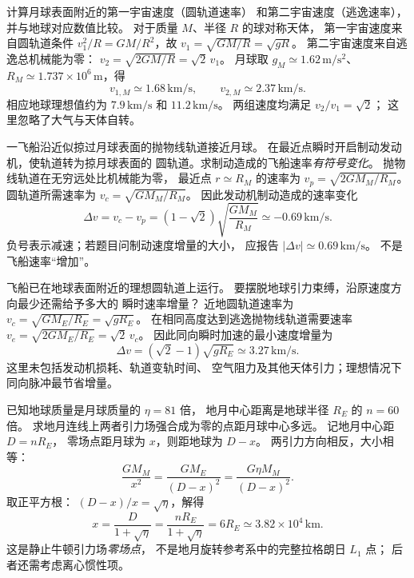 计算月球表面附近的第一宇宙速度（圆轨道速率）
和第二宇宙速度（逃逸速率），并与地球对应数值比较。
\exsolution
对于质量 $M$、半径 $R$ 的球对称天体，
第一宇宙速度来自圆轨道条件
$v_1^2/R=GM/R^2$，故
$v_1=\sqrt{GM/R}=\sqrt{gR}$。
第二宇宙速度来自逃逸总机械能为零：
$v_2=\sqrt{2GM/R}=\sqrt2\,v_1$。
月球取 $g_M\simeq1.62\,\mathrm{m/s^2}$、
$R_M\simeq1.737\times10^6\,\mathrm m$，得
\[
\boxed{v_{1,M}\simeq1.68\,\mathrm{km/s},\qquad
v_{2,M}\simeq2.37\,\mathrm{km/s}}.
\]
相应地球理想值约为
$7.9\,\mathrm{km/s}$ 和 $11.2\,\mathrm{km/s}$。
\excheck 两组速度均满足 $v_2/v_1=\sqrt2$；
这里忽略了大气与天体自转。

一飞船沿近似掠过月球表面的抛物线轨道接近月球。
在最近点瞬时开启制动发动机，使轨道转为掠月球表面的
圆轨道。求制动造成的飞船速率\emph{有符号变化}。
\exsolution
抛物线轨道在无穷远处比机械能为零，
最近点 $r\simeq R_M$ 的速率为
$v_p=\sqrt{2GM_M/R_M}$。
圆轨道所需速率为
$v_c=\sqrt{GM_M/R_M}$。
因此发动机制动造成的速率变化
\[
\boxed{\Delta v=v_c-v_p
=(1-\sqrt2)\sqrt{\frac{GM_M}{R_M}}
\simeq-0.69\,\mathrm{km/s}}.
\]
\excheck 负号表示减速；若题目问制动速度增量的大小，
应报告 $|\Delta v|\simeq0.69\,\mathrm{km/s}$。
不是飞船速率“增加”。

飞船已在地球表面附近的理想圆轨道上运行。
要摆脱地球引力束缚，沿原速度方向最少还需给予多大的
瞬时速率增量？
\exsolution
近地圆轨道速率为
$v_c=\sqrt{GM_E/R_E}=\sqrt{gR_E}$。
在相同高度达到逃逸抛物线轨道需要速率
$v_e=\sqrt{2GM_E/R_E}=\sqrt2\,v_c$。
因此同向瞬时加速的最小速度增量为
\[
\boxed{\Delta v=(\sqrt2-1)\sqrt{gR_E}
\simeq3.27\,\mathrm{km/s}}.
\]
\excheck 这里未包括发动机损耗、轨道变轨时间、
空气阻力及其他天体引力；理想情况下同向脉冲最节省增量。

已知地球质量是月球质量的 $\eta=81$ 倍，
地月中心距离是地球半径 $R_E$ 的 $n=60$ 倍。
求地月连线上两者引力场强合成为零的点距月球中心多远。
\exsolution
记地月中心距 $D=nR_E$，
零场点距月球为 $x$，则距地球为 $D-x$。
两引力方向相反，大小相等：
\[
\frac{GM_M}{x^2}=\frac{GM_E}{(D-x)^2}
=\frac{G\eta M_M}{(D-x)^2}.
\]
取正平方根：
$(D-x)/x=\sqrt\eta$，解得
\[
\boxed{x=\frac{D}{1+\sqrt\eta}
=\frac{nR_E}{1+\sqrt\eta}
=6R_E\simeq3.82\times10^4\,\mathrm{km}}.
\]
\excheck 这是静止牛顿引力场\emph{零场点}，
不是地月旋转参考系中的完整拉格朗日 $L_1$ 点；
后者还需考虑离心惯性项。


